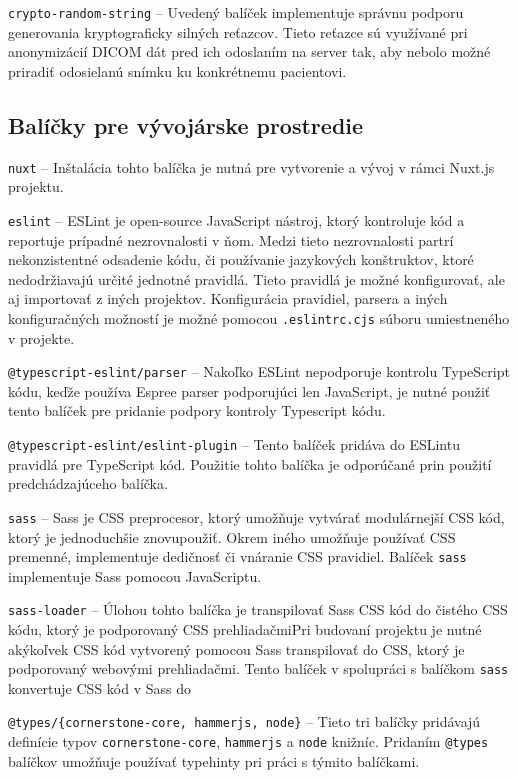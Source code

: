 \texttt{crypto-random-string} -- Uvedený balíček implementuje správnu podporu generovania kryptograficky silných reťazcov. Tieto reťazce sú využívané pri anonymizácií DICOM dát pred ich odoslaním na server tak, aby nebolo možné priradiť odosielanú snímku ku konkrétnemu pacientovi.

\subsection {Balíčky pre vývojárske prostredie}
\texttt{nuxt} -- Inštalácia tohto balíčka je nutná pre vytvorenie a vývoj v rámci Nuxt.js projektu.

\texttt{eslint} -- ESLint je open-source JavaScript nástroj, ktorý kontroluje kód a reportuje prípadné nezrovnalosti v ňom. Medzi tieto nezrovnalosti partrí nekonzistentné odsadenie kódu, či používanie jazykových konštruktov, ktoré nedodržiavajú určité jednotné pravidlá. Tieto pravidlá je možné konfigurovať, ale aj importovať z iných projektov. Konfigurácia pravidiel, parsera a iných konfiguračných možností je možné pomocou \texttt{.eslintrc.cjs} súboru umiestneného v projekte.

\texttt{@typescript-eslint/parser} -- Nakoľko ESLint nepodporuje kontrolu TypeScript kódu, keďže používa Espree parser podporujúci len JavaScript, je nutné použiť tento balíček pre pridanie podpory kontroly Typescript kódu. 

\texttt{@typescript-eslint/eslint-plugin} -- Tento balíček pridáva do ESLintu pravidlá pre TypeScript kód. Použitie tohto balíčka je odporúčané prin použití predchádzajúceho balíčka.

\texttt{sass} -- Sass je CSS preprocesor, ktorý umožňuje vytvárať modulárnejší CSS kód, ktorý je jednoduchšie znovupoužiť. Okrem iného umožňuje používať CSS premenné, implementuje dedičnosť či vnáranie CSS pravidiel. Balíček \texttt{sass} implementuje Sass pomocou JavaScriptu.

\texttt{sass-loader} -- Úlohou tohto balíčka je transpilovať Sass CSS kód do čistého CSS kódu, ktorý je podporovaný CSS prehliadačmiPri budovaní projektu je nutné akýkoľvek CSS kód vytvorený pomocou Sass transpilovať do CSS, ktorý je podporovaný webovými prehliadačmi. Tento balíček v spolupráci s balíčkom \texttt{sass} konvertuje CSS kód v Sass do 

\texttt{@types/\{cornerstone-core, hammerjs, node\}} -- Tieto tri balíčky pridávajú definície typov \texttt{cornerstone-core}, \texttt{hammerjs} a \texttt{node} knižníc. Pridaním \texttt{@types} balíčkov umožňuje používať typehinty pri práci s týmito balíčkami.


